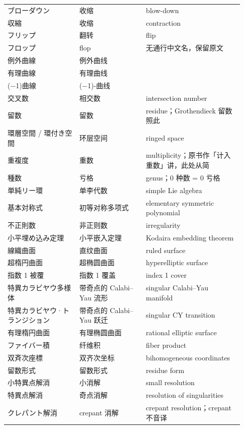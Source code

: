 \begin{longtable}{@{}>{\raggedright\arraybackslash}p{0.29\linewidth}>{\raggedright\arraybackslash}p{0.26\linewidth}>{\raggedright\arraybackslash}p{0.38\linewidth}@{}}
ブローダウン & \mbox{收缩} & blow-down \\
収縮 & \mbox{收缩} & contraction \\
フリップ & \mbox{翻转} & flip \\
フロップ & flop & 无通行中文名，保留原文 \\
例外曲線 & \mbox{例外曲线} &  \\
有理曲線 & \mbox{有理曲线} &  \\
(−1)曲線 & \mbox{(−1)-曲线} &  \\
交叉数 & \mbox{相交数} & intersection number \\
留数 & \mbox{留数} & residue；Grothendieck 留数照此 \\
環層空間 / 環付き空間 & \mbox{环层空间} & ringed space \\
重複度 & \mbox{重数} & multiplicity；原书作「计入重数」讲，此处从简 \\
種数 & \mbox{亏格} & genus；0 种数 = 0 亏格 \\
単純リー環 & \mbox{单李代数} & simple Lie algebra \\
基本対称式 & \mbox{初等对称多项式} & elementary symmetric polynomial \\
不正則数 & \mbox{非正则数} & irregularity \\
小平埋め込み定理 & \mbox{小平嵌入定理} & Kodaira embedding theorem \\
線織曲面 & \mbox{直纹曲面} & ruled surface \\
超楕円曲面 & \mbox{超椭圆曲面} & hyperelliptic surface \\
指数 1 被覆 & \mbox{指数} 1 \mbox{覆盖} & index 1 cover \\
特異カラビ\textendash{}ヤウ多様体 & \mbox{带奇点的} Calabi--Yau \mbox{流形} & singular Calabi--Yau manifold \\
特異カラビ\textendash{}ヤウ·トランジション & \mbox{带奇点的} Calabi--Yau \mbox{跃迁} & singular CY transition \\
有理楕円曲面 & \mbox{有理椭圆曲面} & rational elliptic surface \\
ファイバー積 & \mbox{纤维积} & fiber product \\
双斉次座標 & \mbox{双齐次坐标} & bihomogeneous coordinates \\
留数形式 & \mbox{留数形式} & residue form \\
小特異点解消 & \mbox{小消解} & small resolution \\
特異点解消 & \mbox{奇点消解} & resolution of singularities \\
クレパント解消 & crepant \mbox{消解} & crepant resolution；crepant 不音译 \\

\end{longtable}
